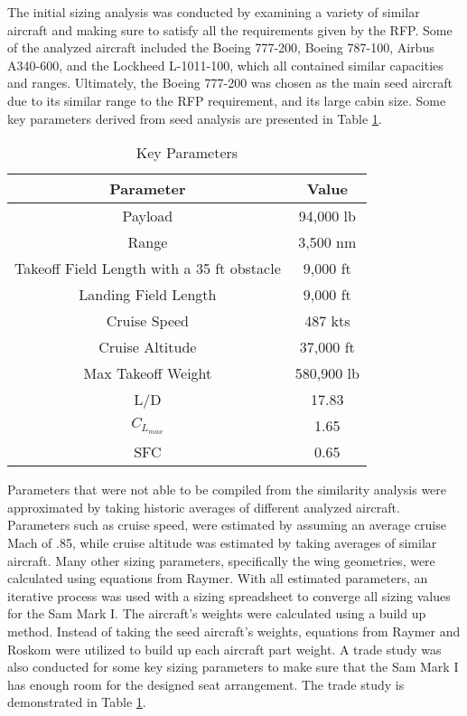 The initial sizing analysis was conducted by examining a variety of similar aircraft and making sure to satisfy all the requirements given by the RFP. Some of the analyzed aircraft included the Boeing 777-200, Boeing 787-100, Airbus A340-600, and the Lockheed L-1011-100, which all contained similar capacities and ranges. Ultimately, the Boeing 777-200 was chosen as the main seed aircraft due to its similar range to the RFP requirement, and its large cabin size. Some key parameters derived from seed analysis are presented in Table \ref{tab:req}. 

\begin{table}[h!] 
    \centering
    \caption{Key Parameters}
    \begin{tabular}{ |c||c| }\toprule
    \textbf{Parameter} & \textbf{Value} \\\hline\hline
    Payload & 94,000 lb  \\\hline
    Range & 3,500 nm \\\hline
    Takeoff Field Length with a 35 ft obstacle & 9,000 ft  \\\hline
    Landing Field Length & 9,000 ft \\\hline
    Cruise Speed & 487 kts\\\hline
    Cruise Altitude & 37,000 ft \\\hline
    Max Takeoff Weight & 580,900 lb\\\hline 
    L/D & 17.83\\\hline 
    $C_{L_{max}}$ & 1.65\\\hline 
    SFC & 0.65\\\hline 

    \end{tabular}\label{tab:req}
\end{table}

Parameters that were not able to be compiled from the similarity analysis were approximated by taking historic averages of different analyzed aircraft. Parameters such as cruise speed, were estimated by assuming an average cruise Mach of .85, while cruise altitude was estimated by taking averages of similar aircraft. Many other sizing parameters, specifically the wing geometries, were calculated using equations from Raymer. With all estimated parameters, an iterative process was used with a sizing spreadsheet to converge all sizing values for the Sam Mark I. The aircraft's weights were calculated using a build up method. Instead of taking the seed aircraft's weights, equations from Raymer and Roskom were utilized to build up each aircraft part weight. A trade study was also conducted for some key sizing parameters to make sure that the Sam Mark I has enough room for the designed seat arrangement. The trade study is demonstrated in Table \ref{tab:req}.

